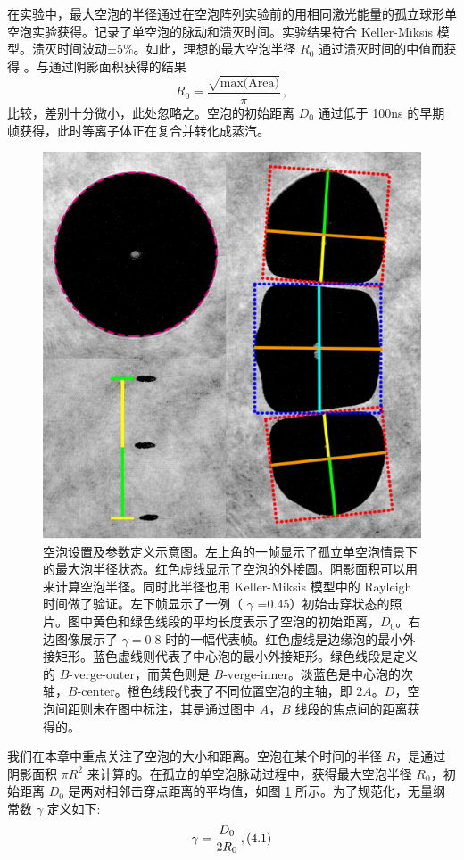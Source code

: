 在实验中，最大空泡的半径通过在空泡阵列实验前的用相同激光能量的孤立球形单空泡实验获得\cite{han_dynamics_2015,fong_interactions_2009}。记录了单空泡的脉动和溃灭时间。实验结果符合 Keller-Miksis
模型。溃灭时间波动±5\%。如此，理想的最大空泡半径 $R_0$
通过溃灭时间的中值而获得 \cite{Kroninger2010}。与通过阴影面积获得的结果
\[R_{\text{0}}=\frac{\sqrt{\text{max(Area)}}}{\pi}\,,\]
比较，差别十分微小，此处忽略之。空泡的初始距离 $D_0$ 通过低于 100ns
的早期帧获得，此时等离子体正在复合并转化成蒸汽\cite{zhang_transient_2016}。



\begin{figure}[H]
    \centering
    \includegraphics[width=0.7\linewidth]{img/fig4.2.png}
    \caption[空泡设置及参数定义示意图]
    {空泡设置及参数定义示意图。左上角的一帧显示了孤立单空泡情景下的最大泡半径状态。红色虚线显示了空泡的外接圆。阴影面积可以用来计算空泡半径。同时此半径也用
Keller-Miksis 模型中的 Rayleigh 时间做了验证。左下帧显示了一例（
$\gamma$
=0.45）初始击穿状态的照片。图中黄色和绿色线段的平均长度表示了空泡的初始距离，$D_0$。右边图像展示了
$\gamma=0.8$
时的一幅代表帧。红色虚线是边缘泡的最小外接矩形。蓝色虚线则代表了中心泡的最小外接矩形。绿色线段是定义的
$B\text{-verge-outer}$，而黄色则是
$B\text{-verge-inner}$。淡蓝色是中心泡的次轴，$B\text{-center}$。橙色线段代表了不同位置空泡的主轴，即
$2A$。$D$，空泡间距则未在图中标注，其是通过图中 $A$，$B$
线段的焦点间的距离获得的。}
    \label{fig:4.2}
\end{figure}

我们在本章中重点关注了空泡的大小和距离。空泡在某个时间的半径
$R$，是通过阴影面积 $\pi R^2$
来计算的。在孤立的单空泡脉动过程中，获得最大空泡半径 $R_0$，初始距离
$D_0$ 是两对相邻击穿点距离的平均值，如图 \ref{fig:4.2}
所示。为了规范化，无量纲常数 $\gamma$ 定义如下:
\[ \gamma=\frac{D_{\text{0}}}{2R_{\text{0}}} \\\,,(4.1)\]

